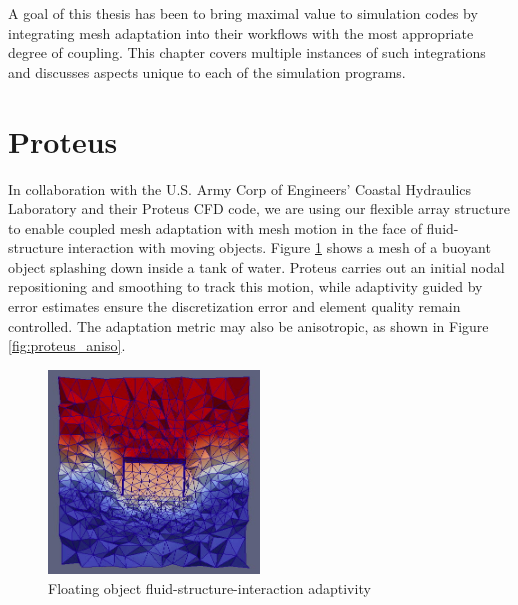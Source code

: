 A goal of this thesis has been to bring maximal value to simulation
codes by integrating mesh adaptation into their workflows with
the most appropriate degree of coupling.
This chapter covers multiple instances of such integrations and
discusses aspects unique to each of the simulation programs.

\section{Proteus}
\label{sec:proteus}

In collaboration with the U.S. Army Corp of Engineers'
Coastal Hydraulics Laboratory and their Proteus CFD code,
we are using our flexible array structure to enable
coupled mesh adaptation with mesh motion in the face
of fluid-structure interaction with moving objects.
Figure \ref{fig:proteus} shows a mesh of a buoyant object
splashing down inside a tank of water.
Proteus carries out an initial nodal repositioning and
smoothing to track this motion, while adaptivity
guided by error estimates ensure the discretization
error and element quality remain controlled.
The adaptation metric may also be anisotropic, as shown
in Figure \ref{fig:proteus_aniso}.

\begin{figure}
\begin{center}
\includegraphics[width=0.5\textwidth]{proteus.png}
\caption{Floating object fluid-structure-interaction adaptivity}
\label{fig:proteus}
\end{center}
\end{figure}

